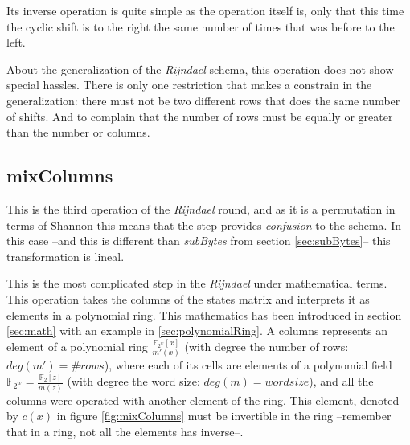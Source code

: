 \documentclass[10pt,a4paper,twoside]{llncs}
\newcommand{\todo}[1]{\texttt{\color{red}TODO:} ``\emph{#1}''}
\newcommand{\Fpn}[2]{\ensuremath{\mathbb{F}_{#1^#2}}}
\newcommand{\Fpnm}[2]{\ensuremath{\frac{\Fpn{2}{#1}[#2]}{m(#2)}}}
\begin{document}
Its inverse operation is quite simple as the operation itself is, only that this time the cyclic shift is to the right the same number of times that was before to the left.

About the generalization of the \emph{Rijndael} schema, this operation does not show special hassles. There is only one restriction that makes a constrain in the generalization: there must not be two different rows that does the same number of shifts. And to complain that the number of rows must be equally or greater than the number or columns.

\subsection{mixColumns}\label{sec:mixColumns}
This is the third operation of the \emph{Rijndael} round, and as it is a permutation in terms of Shannon this means that the step provides \emph{confusion} to the schema. In this case --and this is different than \emph{subBytes} from section \ref{sec:subBytes}-- this transformation is lineal.

This is the most complicated step in the \emph{Rijndael} under mathematical terms. This operation takes the columns of the states matrix and interprets it as elements in a polynomial ring. This mathematics has been introduced in section \ref{sec:math} with an example in \ref{sec:polynomialRing}. A columns represents an element of a polynomial ring $\frac{\Fpn{2}{w}[x]}{m'(x)}$ (with degree the number of rows: $deg(m')=\#rows$), where each of its cells are elements of a polynomial field $\Fpn{2}{w}=\frac{\mathbb{F}_{2}[z]}{m(z)}$  (with degree the word size: $deg(m)=wordsize$), and all the columns were operated with another element of the ring. This element, denoted by $c(x)$ in figure \ref{fig:mixColumns} must be invertible in the ring --remember that in a ring, not all the elements has inverse--.

\end{document}
